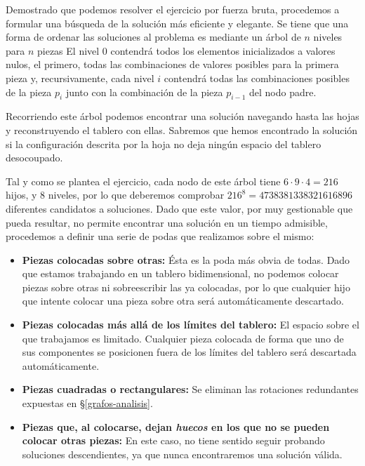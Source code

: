 Demostrado que podemos resolver el ejercicio por fuerza bruta, procedemos a formular una búsqueda de la solución más eficiente y elegante.
Se tiene que una forma de ordenar las soluciones al problema es mediante un árbol de $n$ niveles para $n$ piezas
El nivel $0$ contendrá todos los elementos inicializados a valores nulos, el primero, todas las combinaciones de valores posibles para la primera pieza y, recursivamente, cada nivel $i$ contendrá todas las combinaciones posibles de la pieza $p_i$ junto con la combinación de la pieza $p_{i-1}$ del nodo padre.

\begin{center}
\tikzset{level distance = 50pt}
\end{center}

Recorriendo este árbol podemos encontrar una solución navegando hasta las hojas y reconstruyendo el tablero con ellas.
Sabremos que hemos encontrado la solución si la configuración descrita por la hoja no deja ningún espacio del tablero desocoupado.

Tal y como se plantea el ejercicio, cada nodo de este árbol tiene $6\cdot9\cdot4=216$ hijos, y $8$ niveles, por lo que deberemos comprobar $216^8=4738381338321616896$ diferentes candidatos a soluciones.
Dado que este valor, por muy gestionable que pueda resultar, no permite encontrar una solución en un tiempo admisible, procedemos a definir una serie de podas que realizamos sobre el mismo:

\begin{itemize}
	\item\textbf{Piezas colocadas sobre otras:} Ésta es la poda más obvia de todas. Dado que estamos trabajando en un tablero bidimensional, no podemos colocar piezas sobre otras ni sobreescribir las ya colocadas, por lo que cualquier hijo que intente colocar una pieza sobre otra será automáticamente descartado.
	\item\textbf{Piezas colocadas más allá de los límites del tablero:} El espacio sobre el que trabajamos es limitado. Cualquier pieza colocada de forma que uno de sus componentes se posicionen fuera de los límites del tablero será descartada automáticamente.
	\item\textbf{Piezas cuadradas o rectangulares:} Se eliminan las rotaciones redundantes expuestas en \S\ref{grafos-analisis}.
	\item\textbf{Piezas que, al colocarse, dejan \textit{huecos} en los que no se pueden colocar otras piezas:} En este caso, no tiene sentido seguir probando soluciones descendientes, ya que nunca encontraremos una solución válida.
\end{itemize}

